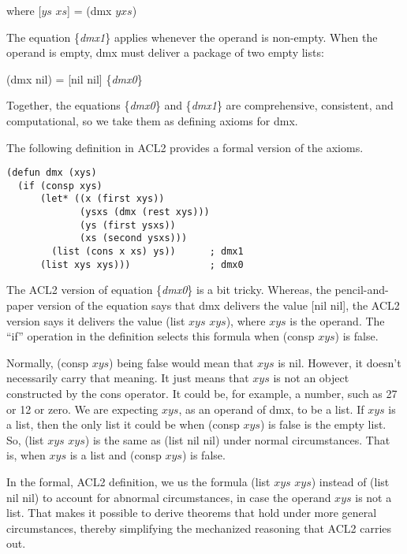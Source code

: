 \hspace{1.4cm} where [$ys$ $xs$] = (dmx $yxs$)

The equation \{\emph{dmx1}\} applies whenever the operand is non-empty.
When the operand is empty, dmx must deliver a package of two empty lists:

\hspace{1cm} (dmx nil) = [nil nil] \hfill \{\emph{dmx0}\}

Together, the equations \{\emph{dmx0}\} and \{\emph{dmx1}\}
are comprehensive, consistent, and computational, so we
take them as defining axioms for dmx.

The following definition in ACL2 provides a formal version of the axioms.

\begin{Verbatim}
(defun dmx (xys)
  (if (consp xys)
      (let* ((x (first xys))
             (ysxs (dmx (rest xys)))
             (ys (first ysxs))
             (xs (second ysxs)))
        (list (cons x xs) ys))      ; dmx1
      (list xys xys)))              ; dmx0
\end{Verbatim}

\begin{aside}
The ACL2 version of equation \{\emph{dmx0}\} is a bit tricky.
Whereas, the pencil-and-paper version of the equation
says that dmx delivers the value [nil nil],
the ACL2 version says it delivers the value (list $xys$ $xys$),
where $xys$ is the operand.
The ``if'' operation in the definition selects this formula
when (consp $xys$) is false.

Normally, (consp $xys$) being false would mean that $xys$ is nil.
However, it doesn't
necessarily carry that meaning.
It just means that $xys$ is not an object constructed by
the cons operator.
It could be, for example, a number, such as 27 or 12 or zero.
We are expecting $xys$, as an operand of dmx, to be a list.
If $xys$ is a list,
then the only list it could be when (consp $xys$) is false
is the empty list. So, (list $xys$ $xys$) is the same
as (list nil nil) under normal circumstances.
That is, when $xys$ is a list and (consp $xys$) is false.

In the formal, ACL2 definition,
we us the formula (list $xys$ $xys$) instead of (list nil nil)
to account for abnormal circumstances, in case the operand $xys$
is not a list. That makes it possible to derive theorems that
hold under more general circumstances, thereby simplifying the
mechanized reasoning that ACL2 carries out.
\label{aside:dmx-defun-trick}
\end{aside}

